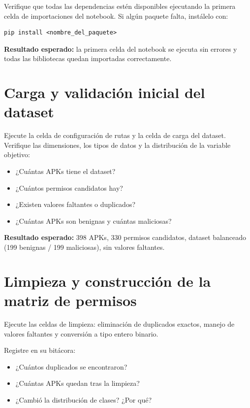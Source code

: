 \documentclass[
  coursetitle={Cómputo Nube y Tecnologías Emergentes},
  coursehours={96},
  coursedate={Verano 2026},
  doctype={Taller},
  otherlangs={english,french},
  authorname={Lázaro},
  authorsurname={Bustio-Martínez},
  authortitle={PhD},
  role={Profesor Investigador},
  email={lbustio@inaoe.mx},
  phone={5559504000},
  ext={7459},
  institution={Instituto Nacional de Astrofísica, Óptica y Electrónica (INAOE)},
  department={Maestría en Ciencias en Tecnologías de Seguridad},
  address={Luis Enrique Erro 1, Sta. Ma. Tonantzintla, San Andrés Cholula, CP 72840, Puebla, México},
  margin={0.5in}
]{../../lbustio_lecture_notes}
\begin{document}
Verifique que todas las dependencias estén disponibles ejecutando la primera celda de importaciones del notebook. Si algún paquete falta, instálelo con:

\begin{lstlisting}
pip install <nombre_del_paquete>
\end{lstlisting}

\begin{tcolorbox}[title=Punto de control 1]
\textbf{Resultado esperado:} la primera celda del notebook se ejecuta sin errores y todas las bibliotecas quedan importadas correctamente.
\end{tcolorbox}

\section{Carga y validación inicial del dataset}

Ejecute la celda de configuración de rutas y la celda de carga del dataset. Verifique las dimensiones, los tipos de datos y la distribución de la variable objetivo:

\begin{itemize}
    \item ¿Cuántas APKs tiene el dataset?
    \item ¿Cuántos permisos candidatos hay?
    \item ¿Existen valores faltantes o duplicados?
    \item ¿Cuántas APKs son benignas y cuántas maliciosas?
\end{itemize}

\begin{tcolorbox}[title=Punto de control 2]
\textbf{Resultado esperado:} 398 APKs, 330 permisos candidatos, dataset balanceado (199 benignas / 199 maliciosas), sin valores faltantes.
\end{tcolorbox}

\section{Limpieza y construcción de la matriz de permisos}

Ejecute las celdas de limpieza: eliminación de duplicados exactos, manejo de valores faltantes y conversión a tipo entero binario.

Registre en su bitácora:

\begin{itemize}
    \item ¿Cuántos duplicados se encontraron?
    \item ¿Cuántas APKs quedan tras la limpieza?
    \item ¿Cambió la distribución de clases? ¿Por qué?
\end{itemize}
\end{document}
